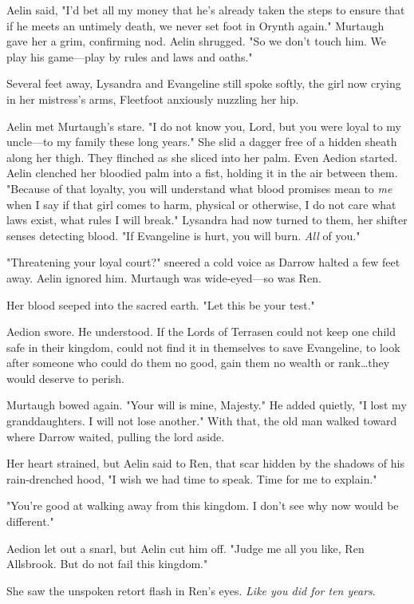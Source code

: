 Aelin said, "I'd bet all my money that he's already taken the steps to ensure that if he meets an untimely death, we never set foot in Orynth again."
Murtaugh gave her a grim, confirming nod.
Aelin shrugged.
"So we don't touch him.
We play his game---play by rules and laws and oaths."

Several feet away, Lysandra and Evangeline still spoke softly, the girl now crying in her mistress's arms, Fleetfoot anxiously nuzzling her hip.

Aelin met Murtaugh's stare.
"I do not know you, Lord, but you were loyal to my uncle---to my family these long years."
She slid a dagger free of a hidden sheath along her thigh.
They flinched as she sliced into her palm.
Even Aedion started.
Aelin clenched her bloodied palm into a fist, holding it in the air between them.
"Because of that loyalty, you will understand what blood promises mean to \emph{me} when I say if that girl comes to harm, physical or otherwise, I do not care what laws exist, what rules I will break."
Lysandra had now turned to them, her shifter senses detecting blood.
"If Evangeline is hurt, you will burn.
\emph{All} of you."

"Threatening your loyal court?" sneered a cold voice as Darrow halted a few feet away.
Aelin ignored him.
Murtaugh was wide-eyed---so was Ren.

Her blood seeped into the sacred earth.
"Let this be your test."

Aedion swore.
He understood.
If the Lords of Terrasen could not keep one child safe in their kingdom, could not find it in themselves to save Evangeline, to look after someone who could do them no good, gain them no wealth or rank\ldots they would deserve to perish.

Murtaugh bowed again.
"Your will is mine, Majesty."
He added quietly, "I lost my granddaughters.
I will not lose another."
With that, the old man walked toward where Darrow waited, pulling the lord aside.

Her heart strained, but Aelin said to Ren, that scar hidden by the shadows of his rain-drenched hood, "I wish we had time to speak.
Time for me to explain."

"You're good at walking away from this kingdom.
I don't see why now would be different."

Aedion let out a snarl, but Aelin cut him off.
"Judge me all you like, Ren Allsbrook.
But do not fail this kingdom."

She saw the unspoken retort flash in Ren's eyes.
\emph{Like you did for ten years}.

